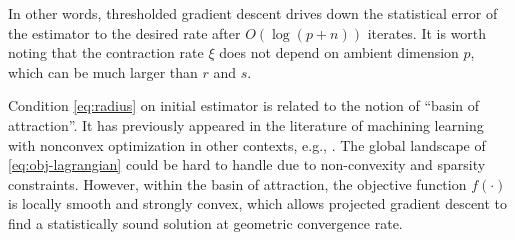 \documentclass[11pt]{article}
\newcommand{\nb}[1]{\textcolor{orange}{\texttt{[#1]}}}
\newcommand{\gsc}[1]{\textcolor{blue}{\texttt{[#1]}}}
\newcommand{\hs}{s'}
\newcommand{\0}{{\mathbf{0}}}
\begin{document}
In other words, thresholded gradient descent drives down the statistical error of the estimator to the desired rate after $O(\log(p+n))$ iterates.
It is worth noting that the contraction rate $\xi$ does not depend on ambient dimension $p$, which can be much larger than $r$ and $s$.

Condition \eqref{eq:radius} on initial estimator is related to the notion of ``basin of attraction''.
It has previously appeared in the literature of machining learning with nonconvex optimization in other contexts, e.g., \cite{chen2015solving,chi2019nonconvex,wang2014tighten}. 
The global landscape of \eqref{eq:obj-lagrangian} could be hard to handle due to non-convexity and sparsity constraints. 
However, within the basin of attraction, the objective function $f(\cdot)$ is locally smooth and strongly convex, which allows projected gradient descent to find a statistically sound solution at geometric convergence rate. 

\iffalse
\nb{wait till simulation section to discuss practice!}
We would also like to comment on the choice of tuning parameters. Though in the theorem we provide a specific choice of tuning parameters $\eta, \lambda$ for gradient descent, as will be seen in the next section, the result is not sensitive to this specific choice. Moreover, it is advised that the hard thresholding level $\hs$ be chosen of the same order of true sparsity $s$, which is unknown to us. Still this choice can be more general and as long as it is greater than the threshold provided, the theorem holds. We are now ready to provide separate results for the gradient step as well as the hard thresholding step. 
\fi
\end{document}
